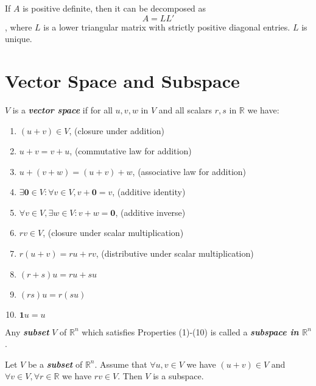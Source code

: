 \begin{proposition}
    If $A$ is positive definite, then it can be decomposed as \begin{equation*}
        A = LL'
    \end{equation*}, where $L$ is a lower triangular matrix with strictly positive diagonal entries. $L$ is unique.
\end{proposition}

\section{Vector Space and Subspace}

\begin{definition}
    $V$ is a \textbf{\textit{vector space}} if for all $u,v,w$ in $V$ and all scalars $r, s$ in $\mathbb{R}$ we have:
    \begin{enumerate}
        \item $(u+v) \in V$, (closure under addition)
        \item $u+v = v+u$, (commutative law for addition)
        \item $u+(v+w) = (u+v) + w$, (associative law for addition)
        \item $\exists \textbf{0} \in V: \forall v \in V, v + \textbf{0} = v$, (additive identity)
        \item $\forall v \in V, \exists w \in V: v+w=\textbf{0}$, (additive inverse)
        \item $rv \in V$, (closure under scalar multiplication)
        \item $r(u+v) = ru+rv$, (distributive under scalar multiplication)
        \item $(r+s)u = ru+su$
        \item $(rs)u = r(su)$
        \item $\textbf{1}u = u$
    \end{enumerate}
\end{definition}

\begin{definition}
    Any \textbf{\textit{subset}} $V$ of $\mathbb{R}^{n}$ which satisfies Properties (1)-(10) is called a \textbf{\textit{subspace in $\mathbb{R}^{n}$}}.
\end{definition}

\begin{theorem}
    Let $V$ be a \textbf{\textit{subset}} of $\mathbb{R}^{n}$. Assume that $\forall u,v \in V$ we have $(u+v) \in V$ and $\forall v \in V, \forall r \in \mathbb{R}$ we have $rv \in V$. Then $V$ is a subspace.
\end{theorem}

